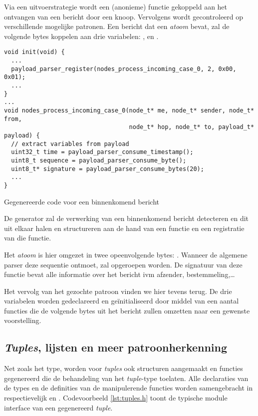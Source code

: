 Via een uitvoerstrategie wordt een (anonieme) functie gekoppeld aan het
ontvangen van een bericht door een knoop. Vervolgens wordt gecontroleerd op
verschillende mogelijke patronen. Een bericht dat een 
\emph{atoom} bevat, zal de volgende bytes koppelen aan drie variabelen:
,  en .

\begin{listing}[ht]
  \begin{verbatim}
void init(void) {
  ...
  payload_parser_register(nodes_process_incoming_case_0, 2, 0x00, 0x01);
  ...
}
...
void nodes_process_incoming_case_0(node_t* me, node_t* sender, node_t* from,
                                   node_t* hop, node_t* to, payload_t* payload) {
  // extract variables from payload
  uint32_t time = payload_parser_consume_timestamp();
  uint8_t sequence = payload_parser_consume_byte();
  uint8_t* signature = payload_parser_consume_bytes(20);
  ...
}
  \end{verbatim}
  \vspace{-5mm}
  \caption{Gegenereerde code voor een binnenkomend bericht}
  \label{lst:comm.c}
\end{listing}

De generator zal de verwerking van een binnenkomend bericht detecteren en dit
uit elkaar halen en structureren aan de hand van een functie en een registratie
van die functie.

Het \emph{atoom} is hier omgezet in twee opeenvolgende bytes: .
Wanneer de algemene parser deze sequentie ontmoet, zal
 opgeroepen worden. De signatuur van
deze functie bevat alle informatie over het bericht ivm afzender,
bestemmeling,\dots

Het vervolg van het gezochte patroon vinden we hier tevens terug. De drie
variabelen worden gedeclareerd en ge\"initialiseerd door middel van een aantal
functies die de volgende bytes uit het bericht zullen omzetten naar een
gewenste voorstelling.

\subsection{\emph{Tuples}, lijsten en meer patroonherkenning}

Net zoals het  type, worden voor \emph{tuples} ook structuren
aangemaakt en functies gegenereerd die de behandeling van het \emph{tuple}-type
toelaten. Alle declaraties van de types en de definities van de manipulerende
functies worden samengebracht in respectievelijk  en
. Codevoorbeeld \ref{lst:tuples.h} toont de typische module
interface van een gegenereerd \emph{tuple}.

